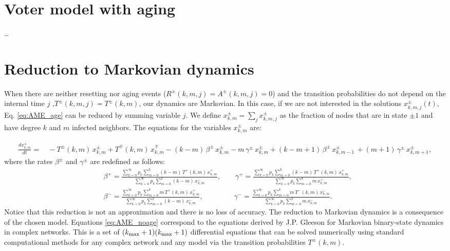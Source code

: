 \section{\label{sec:Voter model with aging} Voter model with aging}

\dots

\section{\label{sec:Reduction to Markovian dynamics}  Reduction to Markovian dynamics}

When there are neither resetting nor aging events ($R^{\pm} (k,m,j) = A^{\pm} (k,m,j) = 0$) and the transition probabilities do not depend on the internal time $j$ ,$T^{\pm} (k,m,j) = T^{\pm} (k,m)$, our dynamics are Markovian. In this case, if we are not interested in the solutions $x^{\pm}_{k,m,j} (t)$, Eq. \ref{eq:AME_age} can be reduced by summing variable $j$. We define $x^{\pm}_{k,m} = \sum_{j} x^{\pm}_{k,m,j}$ as the fraction of nodes that are in state $\pm 1$ and have degree $k$ and $m$ infected neighbors. The equations for the variables $x^{\pm}_{k,m}$ are:

\begin{align}
\label{eq:AME_noage}
    \frac{d x^{\pm}_{k,m}}{dt}  = & \, - T^{\pm} (k,m) \, x^{\pm}_{k,m} + T^{\mp}(k,m) \, x^{\mp}_{k,m} - (k - m)\, \beta^{\pm} \,  x^{\pm}_{k,m} - m\, \gamma^{\pm} \,  x^{\pm}_{k,m} + (k-m+1)\, \beta^{\pm} \,  x^{\pm}_{k,m-1} \, + (m+1)\, \gamma^{\pm} \,  x^{\pm}_{k,m+1},
\end{align}
where the rates $\beta^{\pm}$ and $\gamma^{\pm}$ are redefined as follows:
\begin{align}
    & \beta^{+} = \frac{\sum_{k=0}^{\infty} p_k \sum_{m = 0}^{k} (k - m)\, T^{+} (k,m) \, x^{+}_{k,m}}{\sum_{k=0}^{\infty} p_k \sum_{m = 0}^{k} (k - m)\,  x^{-}_{k,m}}, \quad \quad \gamma^{+} = \frac{\sum_{k=0}^{\infty} p_k \sum_{m = 0}^{k} (k-m)\, T^{+} (k,m) \, x^{+}_{k,m}}{\sum_{k=0}^{\infty} p_k \sum_{m = 0}^{k} m\,  x^{+}_{k,m}}, \nonumber\\
    & \beta^{-} = \frac{\sum_{k=0}^{\infty} p_k \sum_{m = 0}^{k} m \, T^{+} (k,m) \, x^{+}_{k,m}}{\sum_{k=0}^{\infty} p_k \sum_{m = 0}^{k} (k - m)\,  x^{-}_{k,m}}, \quad \quad \quad \quad \; \gamma^{-} = \frac{\sum_{k=0}^{\infty} p_k \sum_{m = 0}^{k} m\, T^{-} (k,m) \, x^{-}_{k,m}}{\sum_{k=0}^{\infty} p_k \sum_{m = 0}^{k} m\,  x^{-}_{k,m}}.
\end{align}
Notice that this reduction is not an approximation and there is no loss of accuracy. The reduction to Markovian dynamics is a consequence of the chosen model. Equations \ref{eq:AME_noage} correspond to the equations derived by J.P. Gleeson \cite{gleeson-2013} for Markovian binary-state dynamics in complex networks. This is a set of $(k_{\rm max}+1)(k_{\rm max}+1)$ differential equations that can be solved numerically using standard computational methods for any complex network and any model via the transition probabilities $T^{\pm} (k,m)$.

